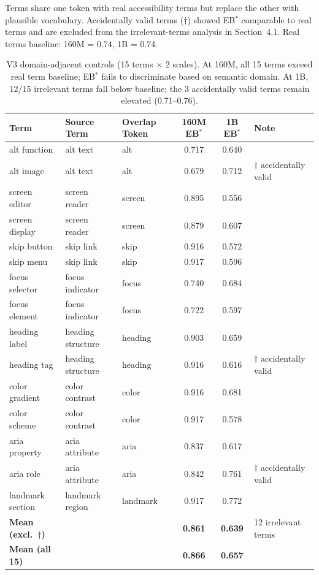 \documentclass[10pt]{article} %
\begin{document}
Terms share one token with real accessibility terms but replace the other with plausible vocabulary.
Accidentally valid terms ($\dagger$) showed EB$^*$ comparable to real terms and are excluded from the irrelevant-terms analysis in Section~4.1.
Real terms baseline: 160M = 0.74, 1B = 0.74.

\begin{table}[H]
\centering
\small
\begin{tabular}{|l|l|l|c|c|l|}
\hline
\textbf{Term} & \textbf{Source Term} & \textbf{Overlap Token} & \textbf{160M EB$^*$} & \textbf{1B EB$^*$} & \textbf{Note} \\
\hline
alt function & alt text & alt & 0.717 & 0.640 & \\
alt image & alt text & alt & 0.679 & 0.712 & $\dagger$ accidentally valid \\
screen editor & screen reader & screen & 0.895 & 0.556 & \\
screen display & screen reader & screen & 0.879 & 0.607 & \\
skip button & skip link & skip & 0.916 & 0.572 & \\
skip menu & skip link & skip & 0.917 & 0.596 & \\
focus selector & focus indicator & focus & 0.740 & 0.684 & \\
focus element & focus indicator & focus & 0.722 & 0.597 & \\
heading label & heading structure & heading & 0.903 & 0.659 & \\
heading tag & heading structure & heading & 0.916 & 0.616 & $\dagger$ accidentally valid \\
color gradient & color contrast & color & 0.916 & 0.681 & \\
color scheme & color contrast & color & 0.917 & 0.578 & \\
aria property & aria attribute & aria & 0.837 & 0.617 & \\
aria role & aria attribute & aria & 0.842 & 0.761 & $\dagger$ accidentally valid \\
landmark section & landmark region & landmark & 0.917 & 0.772 & \\
\hline
\textbf{Mean (excl.\ $\dagger$)} & & & \textbf{0.861} & \textbf{0.639} & 12 irrelevant terms \\
\textbf{Mean (all 15)} & & & \textbf{0.866} & \textbf{0.657} & \\
\hline
\end{tabular}
\caption{V3 domain-adjacent controls (15 terms $\times$ 2 scales). At 160M, all 15 terms exceed real term baseline; EB$^*$ fails to discriminate based on semantic domain. At 1B, 12/15 irrelevant terms fall below baseline; the 3 accidentally valid terms remain elevated (0.71--0.76).}
\end{table}
\end{document}
